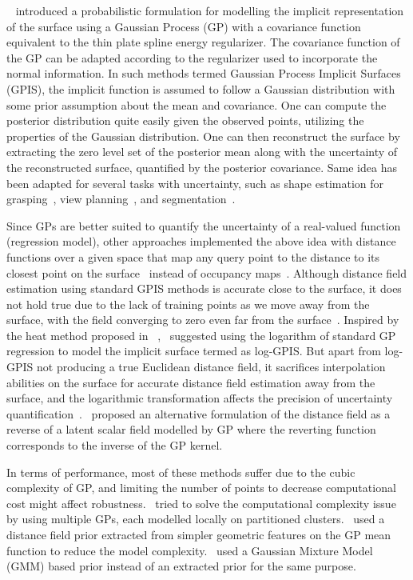 ~\cite{GPIS} introduced a probabilistic formulation for modelling the implicit representation of the surface using a Gaussian Process (GP) with a covariance function equivalent to the thin plate spline energy regularizer. The covariance function of the GP can be adapted according to the regularizer used to incorporate the normal information. In such methods termed Gaussian Process Implicit Surfaces (GPIS), the implicit function is assumed to follow a Gaussian distribution with some prior assumption about the mean and covariance. One can compute the posterior distribution quite easily given the observed points, utilizing the properties of the Gaussian distribution. One can then reconstruct the surface by extracting the zero level set of the posterior mean along with the uncertainty of the reconstructed surface, quantified by the posterior covariance. Same idea has been adapted for several tasks with uncertainty, such as shape estimation for grasping~\cite{GPISGrasp}, view planning~\cite{GPISView}, and segmentation~\cite{GPRSeg}. 

Since GPs are better suited to quantify the uncertainty of a real-valued function (regression model), other approaches implemented the above idea with distance functions over a given space that map any query point to the distance to its closest point on the surface~\cite{logGPIS, geoPriorGPIS, GPDF, onlineGPIS, onlinePriorGPIS} instead of occupancy maps~\cite{GPOccMap}. Although distance field estimation using standard GPIS methods is accurate close to the surface, it does not hold true due to the lack of training points as we move away from the surface, with the field converging to zero even far from the surface~\cite{logGPIS}. Inspired by the heat method proposed in ~\cite{GeodesicHeat},~\cite{logGPIS} suggested using the logarithm of standard GP regression to model the implicit surface termed as log-GPIS. But apart from log-GPIS not producing a true Euclidean distance field, it sacrifices interpolation abilities on the surface for accurate distance field estimation away from the surface, and the logarithmic transformation affects the precision of uncertainty quantification~\cite{onlinePriorGPIS, GPDF}.~\cite{GPDF} proposed an alternative formulation of the distance field as a reverse of a latent scalar field modelled by GP where the reverting function corresponds to the inverse of the GP kernel.

In terms of performance, most of these methods suffer due to the cubic complexity of GP, and limiting the number of points to decrease computational cost might affect robustness.~\cite{mixGPOccMap, locGPOccMap, onlineGPIS} tried to solve the computational complexity issue by using multiple GPs, each modelled locally on partitioned clusters.~\cite{onlinePriorGPIS} used a distance field prior extracted from simpler geometric features on the GP mean function to reduce the model complexity.~\cite{GMMGP} used a Gaussian Mixture Model (GMM) based prior instead of an extracted prior for the same purpose.


